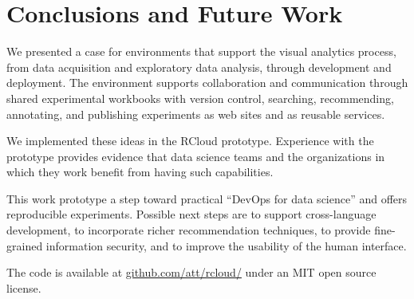 \section{Conclusions and Future Work}

We presented a case for environments that support the visual
analytics process, from data acquisition and exploratory
data analysis, through development and deployment.
The environment supports collaboration and communication
through shared experimental workbooks with version control,
searching, recommending, annotating, and publishing
experiments as web sites and as reusable services. 

We implemented these ideas in the RCloud prototype.
Experience with the prototype provides evidence that data
science teams and the organizations in which they work
benefit from having such capabilities.

This work prototype a step toward practical ``DevOps for data
science'' and offers reproducible experiments.
Possible next steps are to support cross-language development,
to incorporate richer recommendation techniques, to provide fine-grained
information security, and to improve the usability of the human interface.

The code is available 
at \url{github.com/att/rcloud/}
under an MIT open source license.
